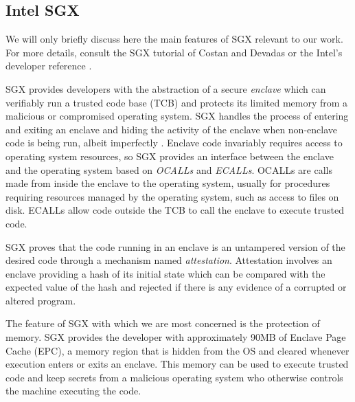 \documentclass[USenglish,oneside,twocolumn]{article}
\begin{document}
\subsection{Intel SGX}

We will only briefly discuss here the main features of SGX relevant to our work. For more details, consult the SGX tutorial of Costan and Devadas \cite{CD16} or the Intel's developer reference \cite{SGXRef}. 

SGX provides developers with the abstraction of a secure \textit{enclave} which can verifiably run a trusted code base (TCB) and protects its limited memory from a malicious or compromised operating system. SGX handles the process of entering and exiting an enclave and hiding the activity of the enclave when non-enclave code is being run, albeit imperfectly \cite{LSG+16}. Enclave code invariably requires access to operating system resources, so SGX provides an interface between the enclave and the operating system based on \textit{OCALLs} and \textit{ECALLs}. OCALLs are calls made from inside the enclave to the operating system, usually for procedures requiring resources managed by the operating system, such as access to files on disk. ECALLs allow code outside the TCB to call the enclave to execute trusted code. 

SGX proves that the code running in an enclave is an untampered version of the desired code through a mechanism named \textit{attestation}. Attestation involves an enclave providing a hash of its initial state which can be compared with the expected value of the hash and rejected if there is any evidence of a corrupted or altered program. 

The feature of SGX with which we are most concerned is the protection of memory. SGX provides the developer with approximately 90MB of Enclave Page Cache (EPC), a memory region that is hidden from the OS and cleared whenever execution enters or exits an enclave. This memory can be used to execute trusted code and keep secrets from a malicious operating system who otherwise controls the machine executing the code. 
\end{document}
